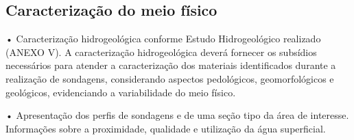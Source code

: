 \subsection{Caracterização do meio físico}

• Caracterização hidrogeológica conforme Estudo 
Hidrogeológico realizado (ANEXO V). A caracterização 
hidrogeológica deverá fornecer os subsídios necessários 
para atender a caracterização dos materiais identificados 
durante a realização de sondagens, considerando aspectos 
pedológicos, geomorfológicos e geológicos, evidenciando a 
variabilidade do meio físico.

• Apresentação dos perfis de sondagens e de uma seção tipo 
da área de interesse. Informações sobre a proximidade, 
qualidade e utilização da água superficial.